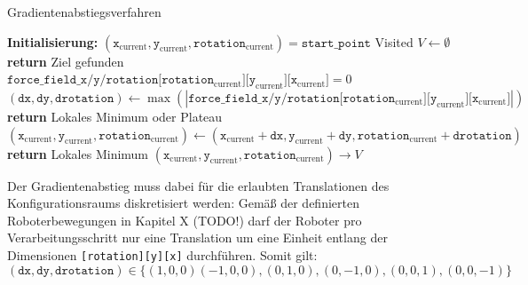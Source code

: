 \begin{algorithm}
\caption{Gradientenabstiegsverfahren}
\begin{algorithmic}[1]
    \State \textbf{Initialisierung:}
    \State \hspace{\algorithmicindent} $(\texttt{x}_{\text{current}}, \texttt{y}_{\text{current}}, \texttt{rotation}_{\text{current}}) = \texttt{start\_point}$
    \State \hspace{\algorithmicindent} Visited $V \leftarrow \emptyset$
	\vspace*{0.3cm}
		\vspace*{0.1cm}
            \State \textbf{return} Ziel gefunden
        \EndIf
		\vspace*{0.1cm}
        \State $\texttt{force\_field\_x/y/rotation}\texttt{[}\texttt{rotation}_{\text{current}}\texttt{][}\texttt{y}_{\text{current}}\texttt{][}\texttt{x}_{\text{current}}\texttt{]} = 0$
        \State $(\texttt{dx}, \texttt{dy}, \texttt{drotation}) \gets \max(|\texttt{force\_field\_x/y/rotation}\texttt{[}\texttt{rotation}_{\text{current}}\texttt{][}\texttt{y}_{\text{current}}\texttt{][}\texttt{x}_{\text{current}}\texttt{]}|)$
		\vspace*{-0.3cm}
            \State \textbf{return} Lokales Minimum oder Plateau
        \EndIf
     	\vspace*{0.1cm}
        \State $(\texttt{x}_{\text{current}}, \texttt{y}_{\text{current}}, \texttt{rotation}_{\text{current}}) \gets (\texttt{x}_{\text{current}} + \texttt{dx}, \texttt{y}_{\text{current}} + \texttt{dy}, \texttt{rotation}_{\text{current}} + \texttt{drotation})$
		\vspace*{-0.3cm}
            \State \textbf{return} Lokales Minimum
		\Else
			\State $(\texttt{x}_{\text{current}}, \texttt{y}_{\text{current}}, \texttt{rotation}_{\text{current}}) \rightarrow V$
        \EndIf
		\vspace*{0.1cm}
    \EndWhile
\end{algorithmic}
\end{algorithm}

Der Gradientenabstieg muss dabei für die erlaubten Translationen des Konfigurationsraums diskretisiert werden: 
Gemäß der definierten Roboterbewegungen in Kapitel X (TODO!) darf der Roboter pro Verarbeitungsschritt nur eine Translation um eine Einheit entlang der Dimensionen \texttt{[rotation][y][x]} durchführen. Somit gilt:
\begin{equation*}
(\texttt{dx}, \texttt{dy}, \texttt{drotation}) \in \{(1,0,0)(-1,0,0),(0,1,0),(0,-1,0),(0,0,1),(0,0,-1)\}
\end{equation*}






